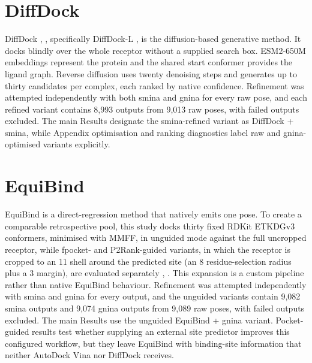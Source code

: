 \hypertarget{diffdock-2}{%
\section{DiffDock}\label{diffdock-2}}

DiffDock \cite{ref024}, \cite{ref008}, specifically DiffDock-L \cite{ref091}, is the diffusion-based generative method. It docks blindly over the whole receptor without a supplied search box. ESM2-650M embeddings represent the protein and the shared start conformer provides the ligand graph. Reverse diffusion uses twenty denoising steps and generates up to thirty candidates per complex, each ranked by native confidence. Refinement was attempted independently with both smina and gnina for every raw pose, and each refined variant contains 8,993 outputs from 9,013 raw poses, with failed outputs excluded. The main Results designate the smina-refined variant as DiffDock + smina, while Appendix optimisation and ranking diagnostics label raw and gnina-optimised variants explicitly.

\hypertarget{equibind-2}{%
\section{EquiBind}\label{equibind-2}}

EquiBind \cite{ref010} is a direct-regression method that natively emits one pose. To create a comparable retrospective pool, this study docks thirty fixed RDKit ETKDGv3 conformers, minimised with MMFF, in unguided mode against the full uncropped receptor, while fpocket- and P2Rank-guided variants, in which the receptor is cropped to an 11 \angstrom{} shell around the predicted site (an 8 \angstrom{} residue-selection radius plus a 3 \angstrom{} margin), are evaluated separately \cite{ref060}, \cite{ref061}. This expansion is a custom pipeline rather than native EquiBind behaviour. Refinement was attempted independently with smina and gnina for every output, and the unguided variants contain 9,082 smina outputs and 9,074 gnina outputs from 9,089 raw poses, with failed outputs excluded. The main Results use the unguided EquiBind + gnina variant. Pocket-guided results test whether supplying an external site predictor improves this configured workflow, but they leave EquiBind with binding-site information that neither AutoDock Vina nor DiffDock receives.

